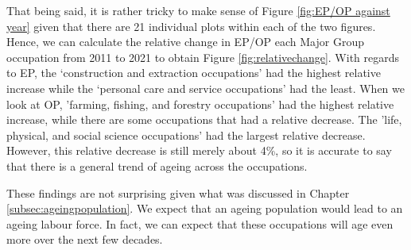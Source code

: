 \documentclass[11pt]{article}
\begin{document}
That being said, it is rather tricky to make sense of Figure \ref{fig:EP/OP against year} given that there are 21 individual plots within each of the two figures. Hence, we can calculate the relative change in EP/OP each Major Group occupation from 2011 to 2021 to obtain Figure \ref{fig:relativechange}. With regards to EP, the `construction and extraction occupations' had the highest relative increase while the `personal care and service occupations' had the least. When we look at OP, 'farming, fishing, and forestry occupations' had the highest relative increase, while there are some occupations that had a relative decrease. The 'life, physical, and social science occupations' had the largest relative decrease. However, this relative decrease is still merely about 4\%, so it is accurate to say that there is a general trend of ageing across the occupations.

These findings are not surprising given what was discussed in Chapter \ref{subsec:ageingpopulation}. We expect that an ageing population would lead to an ageing labour force. In fact, we can expect that these occupations will age even more over the next few decades.
\end{document}
